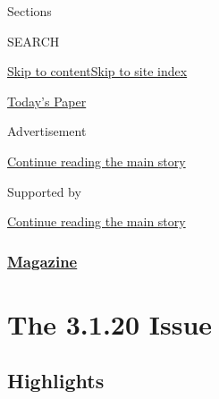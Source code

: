 Sections

SEARCH

\protect\hyperlink{site-content}{Skip to
content}\protect\hyperlink{site-index}{Skip to site index}

\href{https://myaccount.nytimes3xbfgragh.onion/auth/login?response_type=cookie\&client_id=vi}{}

\href{https://www.nytimes3xbfgragh.onion/section/todayspaper}{Today's
Paper}

Advertisement

\protect\hyperlink{after-top}{Continue reading the main story}

Supported by

\protect\hyperlink{after-sponsor}{Continue reading the main story}

\hypertarget{magazine}{%
\subsubsection{\texorpdfstring{\href{/section/magazine}{Magazine}}{Magazine}}\label{magazine}}

\hypertarget{the-3120-issue}{%
\section{The 3.1.20 Issue}\label{the-3120-issue}}

\hypertarget{highlights}{%
\subsection{Highlights}\label{highlights}}

